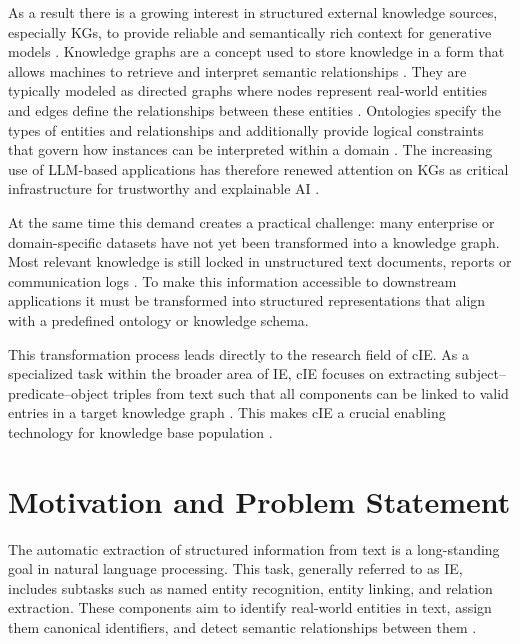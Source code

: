 \documentclass[a4paper,oneside,bibliography=totoc]{scrbook}
\begin{document}
As a result there is a growing interest in structured external knowledge sources, especially \acp{KG}, to provide reliable and semantically rich context for generative models \cite{Korolov2025}. Knowledge graphs are a concept used to store knowledge in a form that allows machines to retrieve and interpret semantic relationships \cite{GomezPerez2017}. They are typically modeled as directed graphs where nodes represent real-world entities and edges define the relationships between these entities \cite{Paulheim2016}. Ontologies specify the types of entities and relationships and additionally provide logical constraints that govern how instances can be interpreted within a domain \cite{GomezPerez2017,Paulheim2016}. The increasing use of \ac{LLM}-based applications has therefore renewed attention on \acp{KG} as critical infrastructure for trustworthy and explainable \ac{AI} \cite{Korolov2025}.

At the same time this demand creates a practical challenge: many enterprise or domain-specific datasets have not yet been transformed into a knowledge graph. Most relevant knowledge is still locked in unstructured text documents, reports or communication logs \cite{Korolov2025}. To make this information accessible to downstream applications it must be transformed into structured representations that align with a predefined ontology or knowledge schema.

This transformation process leads directly to the research field of \ac{cIE}. As a specialized task within the broader area of \ac{IE}, \ac{cIE} focuses on extracting subject–predicate–object triples from text such that all components can be linked to valid entries in a target knowledge graph \cite{Josifoski2021}. This makes \ac{cIE} a crucial enabling technology for knowledge base population \cite{Josifoski2021}.

\section{Motivation and Problem Statement}
\label{sec:motivation}

The automatic extraction of structured information from text is a long-standing goal in natural language processing. This task, generally referred to as \ac{IE}, includes subtasks such as named entity recognition, entity linking, and relation extraction. These components aim to identify real-world entities in text, assign them canonical identifiers, and detect semantic relationships between them \cite{Zhao2024}.
\end{document}

